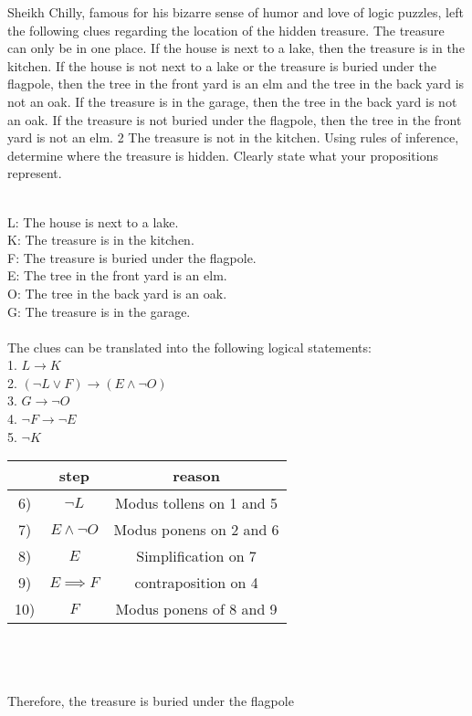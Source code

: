 \documentclass[a4paper]{exam}
\begin{document}
\begin{questions}
  \question Sheikh Chilly, famous for his bizarre sense of humor and love of logic puzzles, left the following clues regarding the location of the hidden treasure. The treasure can only be in one place. If the house is next to a lake, then the treasure is in the kitchen. If the house is not next to a lake or the treasure is buried under the flagpole, then the tree in the front yard is an elm and the tree in the back yard is not an oak. If the treasure is in the garage, then the tree in the back yard is not an oak.  If the treasure is not buried under the flagpole, then the tree in the front yard is not an elm. 2 The treasure is not in the kitchen. Using rules of inference, determine where the treasure is hidden. Clearly state what your propositions represent.
  \begin{solution}\\
    L: The house is next to a lake. \\
    K: The treasure is in the kitchen. \\
    F: The treasure is buried under the flagpole. \\
    E: The tree in the front yard is an elm. \\
    O: The tree in the back yard is an oak. \\
    G: The treasure is in the garage. \\
    \\
    The clues can be translated into the following logical statements: \\
    1. $L \rightarrow K$ \\
    2. $(\neg L \lor F) \rightarrow (E \land \neg O)$ \\
    3. $G \rightarrow \neg O$ \\
    4. $\neg F \rightarrow \neg E$ \\
    5. $\neg K$ \\

    \begin{tabular}{|cc|c|}
      \hline
      & step & reason \\ 
      \hline
      6) & $\neg L$ & Modus tollens on 1 and 5\\
      7) & $E \land \neg O$ & Modus ponens on 2 and 6 \\
      8) & $E$ & Simplification on 7\\
      9) & $E \implies F$ & contraposition on 4\\
      10) & $F$ & Modus ponens of 8 and 9\\
      \hline
    \end{tabular}\\
    \\\\Therefore, the treasure is buried under the flagpole
  \end{solution}
  

\end{questions}
\end{document}
